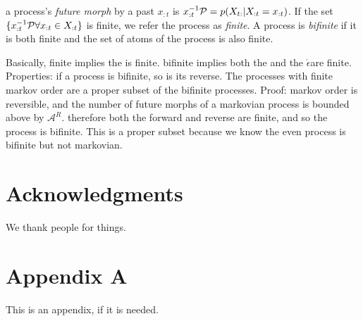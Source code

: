 \documentclass[prl,twocolumn,showpacs,superscriptaddress,preprintnumbers,floatfix]{revtex4-1}
\newcommand{\etomata}{\ensuremath{\acute{\epsilon}}\text{tomata}}
\begin{document}
a process's \emph{future morph} by a past $x_{:t}$ is $x_{:t}^{-1}\mathcal{P} =
p(X_{t:} | X_{:t} = x_{:t})$. If the set $\{ x_{:t}^{-1}\mathcal{P} \forall x_{:t}
\in X_{:t} \}$ is finite, we refer the process as \emph{finite}. A process is
\emph{bifinite} if it is both finite and the set of atoms of the process is also
finite.

Basically, finite implies the \eM is finite. bifinite implies both the
\eM and the \etomata are finite. Properties: if a process is bifinite, so
is its reverse. The processes with finite markov order are a proper subset of
the bifinite processes. Proof: markov order is reversible, and the number of
future morphs of a markovian process is bounded above by $\mathcal{A}^R$.
therefore both the forward and reverse \eMs are finite, and so the
process is bifinite. This is a proper subset because we know the even process is
bifinite but not markovian.

\section*{Acknowledgments}
\label{sec:acknowledgments}

We thank people for things.



\cleardoublepage

\appendix

\section{Appendix A}
\label{sec:appendix_a}

This is an appendix, if it is needed.
\end{document}
